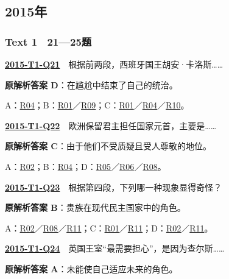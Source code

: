 \documentclass[11pt,a4paper]{article}
\begin{document}
\subsection{2015年}\label{year-2015}
\subsubsection{Text 1　21—25题}
\label{idx-2015-T1-Q21}\noindent\textbf{\href{https://zj139.github.io/math-notes/english/bd84b09056a8e650262124b0/\#q21}{2015-T1-Q21}}　根据前两段，西班牙国王胡安·卡洛斯……\par\nopagebreak
\noindent\textbf{原解析答案 D}：在尴尬中结束了自己的统治。\par\nopagebreak
\noindent A：\hyperref[cat-R04]{R04}；B：\hyperref[cat-R01]{R01}／\hyperref[cat-R09]{R09}；C：\hyperref[cat-R01]{R01}／\hyperref[cat-R04]{R04}／\hyperref[cat-R10]{R10}。\par\smallskip
{}\label{idx-2015-T1-Q22}\noindent\textbf{\href{https://zj139.github.io/math-notes/english/bd84b09056a8e650262124b0/\#q22}{2015-T1-Q22}}　欧洲保留君主担任国家元首，主要是……\par\nopagebreak
\noindent\textbf{原解析答案 C}：由于他们不受质疑且受人尊敬的地位。\par\nopagebreak
\noindent A：\hyperref[cat-R02]{R02}；B：\hyperref[cat-R04]{R04}；D：\hyperref[cat-R05]{R05}／\hyperref[cat-R06]{R06}／\hyperref[cat-R08]{R08}。\par\smallskip
{}\label{idx-2015-T1-Q23}\noindent\textbf{\href{https://zj139.github.io/math-notes/english/bd84b09056a8e650262124b0/\#q23}{2015-T1-Q23}}　根据第四段，下列哪一种现象显得奇怪？\par\nopagebreak
\noindent\textbf{原解析答案 B}：贵族在现代民主国家中的角色。\par\nopagebreak
\noindent A：\hyperref[cat-R02]{R02}／\hyperref[cat-R08]{R08}／\hyperref[cat-R11]{R11}；C：\hyperref[cat-R01]{R01}／\hyperref[cat-R11]{R11}；D：\hyperref[cat-R02]{R02}／\hyperref[cat-R11]{R11}。\par\smallskip
{}\label{idx-2015-T1-Q24}\noindent\textbf{\href{https://zj139.github.io/math-notes/english/bd84b09056a8e650262124b0/\#q24}{2015-T1-Q24}}　英国王室“最需要担心”，是因为查尔斯……\par\nopagebreak
\noindent\textbf{原解析答案 A}：未能使自己适应未来的角色。\par\nopagebreak
\end{document}
